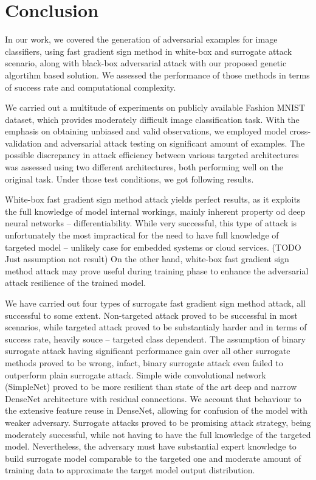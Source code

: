 \chapter*{Conclusion}

In our work, we covered the generation of adversarial examples for image classifiers, using fast gradient sign method in white-box and surrogate attack scenario, along with black-box adversarial attack with our proposed genetic algortihm based solution. We assessed the performance of those methods in terms of success rate and computational complexity.

We carried out a multitude of experiments on publicly available Fashion MNIST dataset, which provides moderately difficult image classification task. With the emphasis on obtaining unbiased and valid observations, we employed model cross-validation and adversarial attack testing on significant amount of examples. The possible discrepancy in attack efficiency between various targeted architectures was assessed using two different architectures, both performing well on the original task. Under those test conditions, we got following results.

White-box fast gradient sign method attack yields perfect results, as it exploits the full knowledge of model internal workings, mainly inherent property od deep neural networks -- differentiability. While very successful, this type of attack is unfortunately the most impractical for the need to have full knowledge of targeted model -- unlikely case for embedded systems or cloud services. (TODO Just assumption not result) On the other hand, white-box fast gradient sign method attack may prove useful during training phase to enhance the adversarial attack resilience of the trained model.

We have carried out four types of surrogate fast gradient sign method attack, all successful to some extent. Non-targeted attack proved to be successful in most scenarios, while targeted attack proved to be substantialy harder and in terms of success rate, heavily souce -- targeted class dependent. The assumption of binary surrogate attack having significant performance gain over all other surrogate methods proved to be wrong, infact, binary surrogate attack even failed to outperform plain surrogate attack. Simple wide convolutional network (SimpleNet) proved to be more resilient than state of the art deep and narrow DenseNet architecture with residual connections. We account that behaviour to the extensive feature reuse in DenseNet, allowing for confusion of the model with weaker adversary. Surrogate attacks proved to be promising attack strategy, being moderately successful, while not having to have the full knowledge of the targeted model. Nevertheless, the adversary must have substantial expert knowledge to build surrogate model comparable to the targeted one and moderate amount of training data to approximate the target model output distribution.

